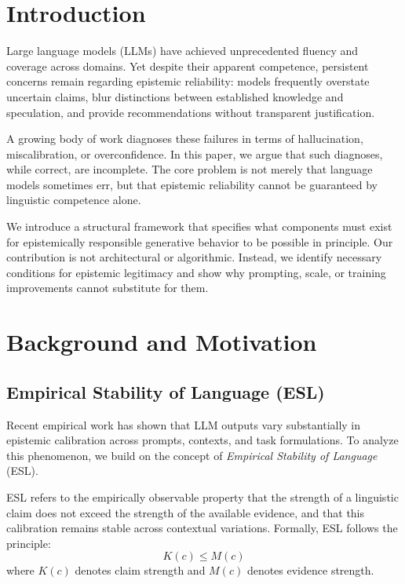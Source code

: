 \documentclass[11pt,a4paper]{article}
\begin{document}
\section{Introduction}

Large language models (LLMs) have achieved unprecedented fluency and coverage across domains. Yet despite their apparent competence, persistent concerns remain regarding epistemic reliability: models frequently overstate uncertain claims, blur distinctions between established knowledge and speculation, and provide recommendations without transparent justification.

A growing body of work diagnoses these failures in terms of hallucination, miscalibration, or overconfidence. In this paper, we argue that such diagnoses, while correct, are incomplete. The core problem is not merely that language models sometimes err, but that epistemic reliability cannot be guaranteed by linguistic competence alone.

We introduce a structural framework that specifies what components must exist for epistemically responsible generative behavior to be possible in principle. Our contribution is not architectural or algorithmic. Instead, we identify necessary conditions for epistemic legitimacy and show why prompting, scale, or training improvements cannot substitute for them.


\section{Background and Motivation}

\subsection{Empirical Stability of Language (ESL)}

Recent empirical work has shown that LLM outputs vary substantially in epistemic calibration across prompts, contexts, and task formulations. To analyze this phenomenon, we build on the concept of \emph{Empirical Stability of Language} (ESL).

ESL refers to the empirically observable property that the strength of a linguistic claim does not exceed the strength of the available evidence, and that this calibration remains stable across contextual variations. Formally, ESL follows the principle:
\[
K(c) \le M(c)
\]
where $K(c)$ denotes claim strength and $M(c)$ denotes evidence strength.
\end{document}

